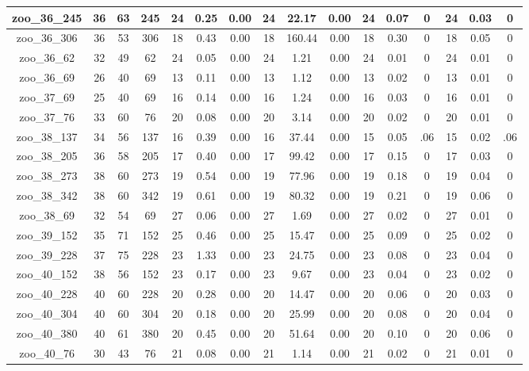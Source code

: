 \begin{landscape}
\begin{longtable}{|c|c|c|c|c|c|c|c|c|c|c|c|c|c|c|c|}
zoo\_36\_245 & 36 & 63 & 245 & 24 & 0.25 & 0.00 & 24 & 22.17 & 0.00 & 24 & 0.07 & 0 & 24 & 0.03 & 0 \\ \hline 
zoo\_36\_306 & 36 & 53 & 306 & 18 & 0.43 & 0.00 & 18 & 160.44 & 0.00 & 18 & 0.30 & 0 & 18 & 0.05 & 0 \\ \hline 
zoo\_36\_62 & 32 & 49 & 62 & 24 & 0.05 & 0.00 & 24 & 1.21 & 0.00 & 24 & 0.01 & 0 & 24 & 0.01 & 0 \\ \hline 
zoo\_36\_69 & 26 & 40 & 69 & 13 & 0.11 & 0.00 & 13 & 1.12 & 0.00 & 13 & 0.02 & 0 & 13 & 0.01 & 0 \\ \hline 
zoo\_37\_69 & 25 & 40 & 69 & 16 & 0.14 & 0.00 & 16 & 1.24 & 0.00 & 16 & 0.03 & 0 & 16 & 0.01 & 0 \\ \hline 
zoo\_37\_76 & 33 & 60 & 76 & 20 & 0.08 & 0.00 & 20 & 3.14 & 0.00 & 20 & 0.02 & 0 & 20 & 0.01 & 0 \\ \hline 
zoo\_38\_137 & 34 & 56 & 137 & 16 & 0.39 & 0.00 & 16 & 37.44 & 0.00 & 15 & 0.05 & .06 & 15 & 0.02 & .06 \\ \hline 
zoo\_38\_205 & 36 & 58 & 205 & 17 & 0.40 & 0.00 & 17 & 99.42 & 0.00 & 17 & 0.15 & 0 & 17 & 0.03 & 0 \\ \hline 
zoo\_38\_273 & 38 & 60 & 273 & 19 & 0.54 & 0.00 & 19 & 77.96 & 0.00 & 19 & 0.18 & 0 & 19 & 0.04 & 0 \\ \hline 
zoo\_38\_342 & 38 & 60 & 342 & 19 & 0.61 & 0.00 & 19 & 80.32 & 0.00 & 19 & 0.21 & 0 & 19 & 0.06 & 0 \\ \hline 
zoo\_38\_69 & 32 & 54 & 69 & 27 & 0.06 & 0.00 & 27 & 1.69 & 0.00 & 27 & 0.02 & 0 & 27 & 0.01 & 0 \\ \hline 
zoo\_39\_152 & 35 & 71 & 152 & 25 & 0.46 & 0.00 & 25 & 15.47 & 0.00 & 25 & 0.09 & 0 & 25 & 0.02 & 0 \\ \hline 
zoo\_39\_228 & 37 & 75 & 228 & 23 & 1.33 & 0.00 & 23 & 24.75 & 0.00 & 23 & 0.08 & 0 & 23 & 0.04 & 0 \\ \hline 
zoo\_40\_152 & 38 & 56 & 152 & 23 & 0.17 & 0.00 & 23 & 9.67 & 0.00 & 23 & 0.04 & 0 & 23 & 0.02 & 0 \\ \hline 
zoo\_40\_228 & 40 & 60 & 228 & 20 & 0.28 & 0.00 & 20 & 14.47 & 0.00 & 20 & 0.06 & 0 & 20 & 0.03 & 0 \\ \hline 
zoo\_40\_304 & 40 & 60 & 304 & 20 & 0.18 & 0.00 & 20 & 25.99 & 0.00 & 20 & 0.08 & 0 & 20 & 0.04 & 0 \\ \hline 
zoo\_40\_380 & 40 & 61 & 380 & 20 & 0.45 & 0.00 & 20 & 51.64 & 0.00 & 20 & 0.10 & 0 & 20 & 0.06 & 0 \\ \hline 
zoo\_40\_76 & 30 & 43 & 76 & 21 & 0.08 & 0.00 & 21 & 1.14 & 0.00 & 21 & 0.02 & 0 & 21 & 0.01 & 0 \\ \hline 

\end{longtable}
\end{landscape}
